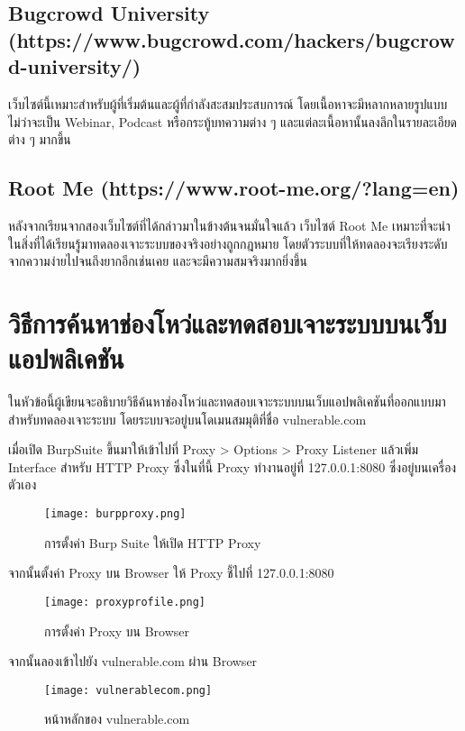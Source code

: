 \subsection{Bugcrowd University (https://www.bugcrowd.com/hackers/bugcrowd-university/)}

เว็บไซต์นี้เหมาะสำหรับผู้ที่เริ่มต้นและผู้ที่กำลังสะสมประสบการณ์ โดยเนื้อหาจะมีหลากหลายรูปแบบ ไม่ว่าจะเป็น Webinar, Podcast หรือกระทู้บทความต่าง ๆ และแต่ละเนื้อหานั้นลงลึกในรายละเอียดต่าง ๆ มากขึ้น

\subsection{Root Me (https://www.root-me.org/?lang=en)}

หลังจากเรียนจากสองเว็บไซต์ที่ได้กล่าวมาในข้างต้นจนมั่นใจแล้ว เว็บไซต์ Root Me เหมาะที่จะนำในสิ่งที่ได้เรียนรู้มาทดลองเจาะระบบของจริงอย่างถูกกฎหมาย โดยตัวระบบที่ให้ทดลองจะเรียงระดับจากความง่ายไปจนถึงยากอีกเช่นเคย และจะมีความสมจริงมากยิ่งขึ้น

\section{วิธีการค้นหาช่องโหว่และทดสอบเจาะระบบบนเว็บแอปพลิเคชัน}
ในหัวข้อนี้ผู้เขียนจะอธิบายวิธีค้นหาช่องโหว่และทดสอบเจาะระบบบนเว็บแอปพลิเคชันที่ออกแบบมาสำหรับทดลองเจาะระบบ \cite{wreck-it-lab} โดยระบบจะอยู่บนโดเมนสมมุติที่ชื่อ vulnerable.com

เมื่อเปิด BurpSuite ขึ้นมาให้เข้าไปที่ Proxy > Options > Proxy Listener แล้วเพิ่ม Interface สำหรับ HTTP Proxy ซึ่งในที่นี้ Proxy ทำงานอยู่ที่ 127.0.0.1:8080 ซึ่งอยู่บนเครื่องตัวเอง

\begin{figure}[h]
	\centering
	\texttt{[image: burpproxy.png]}
	\caption{การตั้งค่า Burp Suite ให้เปิด HTTP Proxy}
	\label{Fig:burpproxy.png}
\end{figure}

จากนั้นตั้งค่า Proxy บน Browser ให้ Proxy ชี้ไปที่ 127.0.0.1:8080

\begin{figure}[h]
	\centering
	\texttt{[image: proxyprofile.png]}
	\caption{การตั้งค่า Proxy บน Browser}
	\label{Fig:proxyprofile.png}
\end{figure}

จากนั้นลองเข้าไปยัง vulnerable.com ผ่าน Browser

\begin{figure}[h]
	\centering
	\texttt{[image: vulnerablecom.png]}
	\caption{หน้าหลักของ vulnerable.com}
	\label{Fig:vulnerablecom.png}
\end{figure}

